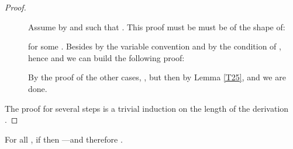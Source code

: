 \begin{proof}
\begin{description}
\item[] Assume  by  and  such that
  . This proof must be must be of the shape of:

for some . Besides  by the variable convention and  by the condition of , hence   and we can build the following proof: 

 \item[] By the proof of the other cases, , but then  by Lemma \ref{T25}, and we are done.
\end{description}

The proof for several steps is a trivial induction on the length of the derivation .
\end{proof}

For all , if  then ---and therefore .

